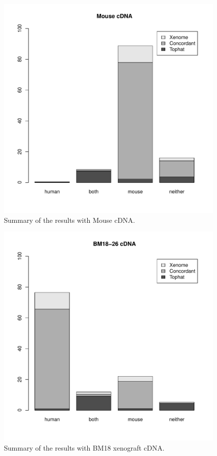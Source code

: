 \documentclass[twocolumn]{article}
\begin{document}
\begin{figure}
\includegraphics[scale=0.4]{mouse.pdf}
\caption{Summary of the results with Mouse cDNA.}
\label{fig:mouse}
\end{figure}

\begin{figure}
\includegraphics[scale=0.4]{bm18-26.pdf}
\caption{Summary of the results with BM18 xenograft cDNA.}
\label{fig:bm18}
\end{figure}
\end{document}
